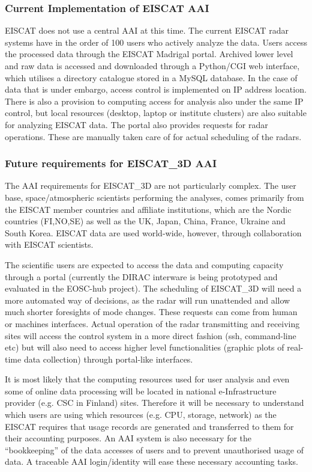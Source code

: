 \documentclass[fleqn,10pt]{wlscirep}
\begin{document}
{\subsubsection{Current Implementation of EISCAT AAI}
EISCAT does not use a central AAI at this time. The current EISCAT radar systems have in the order of 100 users who actively analyze the data. Users access the processed data through the EISCAT Madrigal portal\cite{madrigal}. Archived lower level and raw data is accessed and downloaded through a Python/CGI web interface, which utilises a directory catalogue stored in a MySQL database. In the case of data that is under embargo, access control is implemented on IP address location. There is also a provision to computing access for analysis also under the same IP control, but local resources (desktop, laptop or institute clusters) are also suitable for analyzing EISCAT data. The portal also provides requests for radar operations. These are manually taken care of for actual scheduling of the radars.

\subsubsection{Future requirements for EISCAT\_3D AAI}
The AAI requirements for EISCAT\_3D are not particularly complex. The user base, space/atmospheric scientists performing the analyses, comes primarily from the EISCAT member countries and affiliate institutions, which are the Nordic countries (FI,NO,SE) as well as the UK, Japan, China, France, Ukraine and South Korea. EISCAT data are used world-wide, however, through collaboration with EISCAT scientists.

The scientific users are expected to access the data and computing capacity through a portal (currently the DIRAC interware is being prototyped and evaluated in the EOSC-hub project). The scheduling of EISCAT\_3D will need a more automated way of decisions, as the radar will run unattended and allow much shorter foresights of mode changes. These requests can come from human or machines interfaces. Actual operation of the radar transmitting and receiving sites will access the control system in a more direct fashion (ssh, command-line etc) but will also need to access higher level functionalities (graphic plots of real-time data collection) through portal-like interfaces.

It is most likely that the computing resources used for user analysis and even some of online data processing will be located in national e-Infrastructure provider (e.g. CSC in Finland) sites. 
Therefore it will be necessary to understand which users are using which resources (e.g. CPU, storage, network) as the EISCAT requires that usage records are generated and transferred to them for their accounting purposes. An AAI system is also necessary for the “bookkeeping” of the data accesses of users and to prevent unauthorised usage of data. A traceable AAI login/identity will ease these necessary accounting tasks.

}
\end{document}
